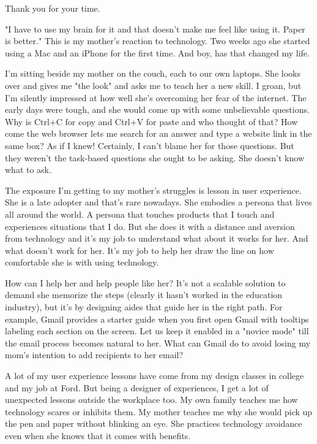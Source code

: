 \documentclass[10pt,a4paper,sans]{moderncv}        %
\begin{document}
\date{May 25, 2015}
\opening{}
\closing{Thank you for your time.}
\makelettertitle

"I have to use my brain for it and that doesn't make me feel like using it. Paper is better."  This is my mother's reaction to technology.  Two weeks ago she started using a Mac and an iPhone for the first time.  And boy, has that changed my life.

I'm sitting beside my mother on the couch, each to our own laptops.  She looks over and gives me  "the look" and asks me to teach her a new skill.  I groan, but I'm silently impressed at how well she's overcoming her fear of the internet.  The early days were tough, and she would come up with some unbelievable questions.  Why is Ctrl+C for copy and Ctrl+V for paste and who thought of that?  How come the web browser lets me search for an answer and type a website link in the same box?  As if I knew!  Certainly, I can't blame her for those questions.  But they weren't the task-based questions she ought to be asking. She doesn't know what to ask. 

The exposure I'm getting to my mother's struggles is lesson in user experience.  She is a late adopter and that's rare nowadays.  She embodies a persona that lives all around the world.  A persona that touches products that I touch and experiences situations that I do.  But she does it with a distance and aversion from technology and it's my job to understand what about it works for her.  And what doesn't work for her.  It's my job to help her draw the line on how comfortable she is with using technology.    

How can I help her and help people like her?  It's not a scalable solution to demand she memorize the steps (clearly it hasn't worked in the education industry), but it's by designing aides that guide her in the right path.  For example, Gmail provides a starter guide when you first open Gmail with tooltips labeling each section on the screen. Let us keep it enabled in a "novice mode" till the email process becomes natural to her.  What can Gmail do to avoid losing my mom's intention to add recipients to her email?

A lot of my user experience lessons have come from my design classes in college and my job at Ford.  But being a designer of experiences, I get a lot of unexpected lessons outside the workplace too.  My own family teaches me how technology scares or inhibits them. My mother teaches me why she would pick up the pen and paper without blinking an eye.  She practices technology avoidance even when she knows that it comes with benefits.  
\end{document}
